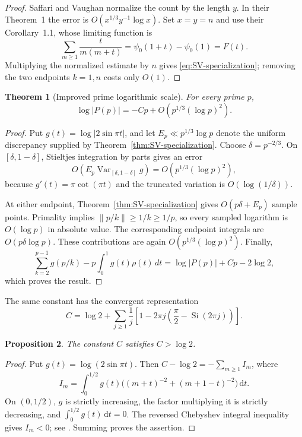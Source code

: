 \documentclass[11pt]{amsart}
\numberwithin{equation}{section}
\newtheorem{theorem}{Theorem}[section]
\newtheorem{proposition}[theorem]{Proposition}
\theoremstyle{definition}
\theoremstyle{remark}
\newcommand{\dd}{\,\mathrm d}
\begin{document}
\begin{proof}
Saffari and Vaughan normalize the count by the length \(y\).  In their
Theorem~1 the error is \(O(x^{1/3}y^{-1}\log x)\).  Set \(x=y=n\) and use
their Corollary~1.1, whose limiting function is
\[
 \sum_{m\ge1}\frac{t}{m(m+t)}
 =\psi_0(1+t)-\psi_0(1)=F(t).
\]
Multiplying the normalized estimate by \(n\) gives
\eqref{eq:SV-specialization}; removing the two endpoints \(k=1,n\) costs
only \(O(1)\).
\end{proof}

\begin{theorem}[Improved prime logarithmic scale]\label{thm:prime-third-scale}
For every prime \(p\),
\begin{equation}\label{eq:prime-third-scale}
 \log|P(p)|=-Cp+O\!\left(p^{1/3}(\log p)^2\right).
\end{equation}
\end{theorem}

\begin{proof}
Put \(g(t)=\log|2\sin\pi t|\), and let
\(E_p\ll p^{1/3}\log p\) denote the uniform discrepancy supplied by
Theorem~\ref{thm:SV-specialization}.  Choose
\(\delta=p^{-2/3}\).  On \([\delta,1-\delta]\), Stieltjes integration by
parts gives an error
\[
 O\!\left(E_p\operatorname{Var}_{[\delta,1-\delta]}g\right)
 =O\!\left(p^{1/3}(\log p)^2\right),
\]
because \(g'(t)=\pi\cot(\pi t)\) and the truncated variation is
\(O(\log(1/\delta))\).

At either endpoint, Theorem~\ref{thm:SV-specialization} gives
\(O(p\delta+E_p)\) sample points.  Primality implies
\(\|p/k\|\ge1/k\ge1/p\), so every sampled logarithm is \(O(\log p)\) in
absolute value.  The corresponding endpoint integrals are
\(O(p\delta\log p)\).  These contributions are again
\(O(p^{1/3}(\log p)^2)\).  Finally,
\[
 \sum_{k=2}^{p-1}g(p/k)-p\int_0^1g(t)\rho(t)\,dt
 =\log|P(p)|+Cp-2\log2,
\]
which proves the result.
\end{proof}

The same constant has the convergent representation
\begin{equation}\label{eq:C-series}
 C=\log2+\sum_{j\geq1}\frac1j
 \left[1-2\pi j\left(\frac\pi2-\operatorname{Si}(2\pi j)\right)\right].
\end{equation}

\begin{proposition}\label{prop:C-strict}
The constant \(C\) satisfies \(C>\log2\).
\end{proposition}

\begin{proof}
Put \(g(t)=\log(2\sin\pi t)\).  Then
\(C-\log2=-\sum_{m\geq1}I_m\), where
\[
 I_m=\int_0^{1/2}g(t)
 \bigl((m+t)^{-2}+(m+1-t)^{-2}\bigr)\dd t.
\]
On \((0,1/2)\), \(g\) is strictly increasing, the factor multiplying it
is strictly decreasing, and \(\int_0^{1/2}g(t)\dd t=0\).  The reversed
Chebyshev integral inequality gives \(I_m<0\); see
\cite{HardyLittlewoodPolya1952}.  Summing proves the assertion.
\end{proof}
\end{document}
